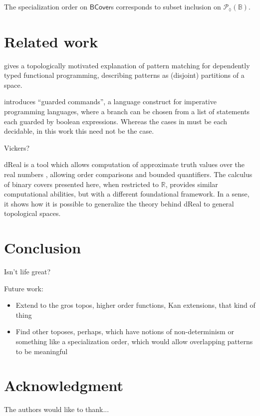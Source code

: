 \documentclass[conference]{IEEEtran}
\newcommand{\PLower}{\mathcal{P}_\lozenge}
\newcommand{\R}{\mathbb{R}}
\newcommand{\bool}{\mathbb{B}}
\begin{document}
The specialization order on $\mathsf{BCover}$s corresponds to subset inclusion on $\PLower(\bool)$.

\section{Related work}

\cite{coquand1992} gives a topologically motivated explanation of pattern matching for dependently typed functional programming, describing patterns as (disjoint) partitions of a space.

\cite{dijkstra} introduces ``guarded commands'', a language construct for imperative programming languages, where a branch can be chosen from a list of statements each guarded by boolean expressions. Whereas the cases in \cite{dijkstra} must be each decidable, in this work this need not be the case.

Vickers?

dReal is a tool which allows computation of approximate truth values over the real numbers \cite{dReal}, allowing order comparisons and bounded quantifiers. The calculus of binary covers presented here, when restricted to $\R$, provides similar computational abilities, but with a different foundational framework. In a sense, it shows how it is possible to generalize the theory behind dReal to general topological spaces.

\section{Conclusion}
Isn't life great?

Future work:
\begin{itemize}
\item Extend to the gros topos, higher order functions, Kan extensions, that kind of thing
\item Find other toposes, perhaps, which have notions of non-determinism or something like a specialization order, which would allow overlapping patterns to be meaningful
\end{itemize}




\section*{Acknowledgment}


The authors would like to thank...
\end{document}
